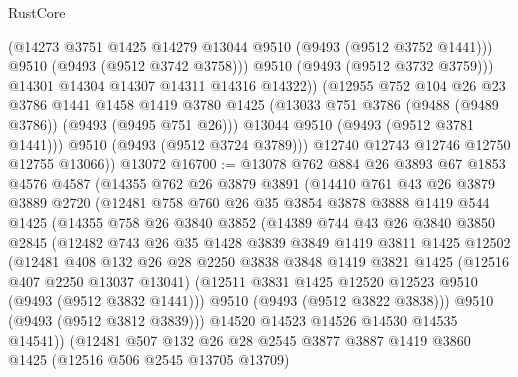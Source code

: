 \begin{lexlean}{RustCore}
\begin{coremodule}
                  (@14273 @3751 @1425 @14279 @13044 @9510 (@9493 (@9512 @3752 @1441)))
                  @9510
                  (@9493 (@9512 @3742 @3758)))
                @9510
                (@9493 (@9512 @3732 @3759)))
              @14301
              @14304
              @14307
              @14311
              @14316
              @14322))
          (@12955
            @752
            @104
            @26
            @23
            @3786
            @1441
            @1458
            @1419
            @3780
            @1425
            (@13033 @751 @3786 (@9488 (@9489 @3786)) (@9493 (@9495 @751 @26)))
            @13044
            @9510
            (@9493 (@9512 @3781 @1441)))
          @9510
          (@9493 (@9512 @3724 @3789)))
        @12740
        @12743
        @12746
        @12750
        @12755
        @13066))
    @13072
@16700 := @13078
    @762
    @884
    @26
    @3893
    @67
    @1853
    @4576
    @4587
    (@14355
      @762
      @26
      @3879
      @3891
      (@14410
        @761
        @43
        @26
        @3879
        @3889
        @2720
        (@12481
          @758
          @760
          @26
          @35
          @3854
          @3878
          @3888
          @1419
          @544
          @1425
          (@14355
            @758
            @26
            @3840
            @3852
            (@14389
              @744
              @43
              @26
              @3840
              @3850
              @2845
              (@12482
                @743
                @26
                @35
                @1428
                @3839
                @3849
                @1419
                @3811
                @1425
                @12502
                (@12481
                  @408
                  @132
                  @26
                  @28
                  @2250
                  @3838
                  @3848
                  @1419
                  @3821
                  @1425
                  (@12516 @407 @2250 @13037 @13041)
                  (@12511 @3831 @1425 @12520 @12523 @9510 (@9493 (@9512 @3832 @1441)))
                  @9510
                  (@9493 (@9512 @3822 @3838)))
                @9510
                (@9493 (@9512 @3812 @3839)))
              @14520
              @14523
              @14526
              @14530
              @14535
              @14541))
          (@12481
            @507
            @132
            @26
            @28
            @2545
            @3877
            @3887
            @1419
            @3860
            @1425
            (@12516 @506 @2545 @13705 @13709)

\end{coremodule}
\end{lexlean}
